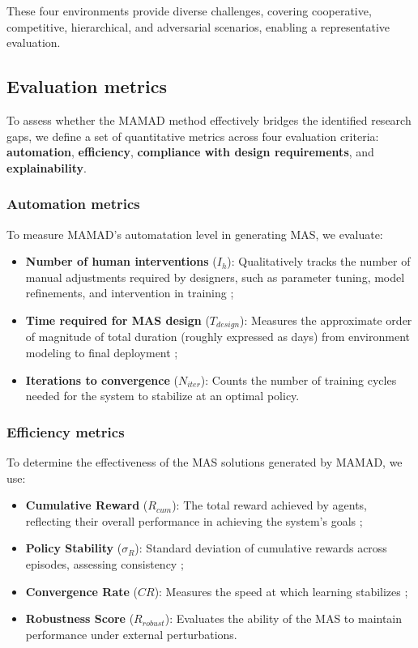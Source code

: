 \documentclass[journal]{IEEEtai}
\begin{document}
\noindent These four environments provide diverse challenges, covering cooperative, competitive, hierarchical, and adversarial scenarios, enabling a representative evaluation.


\subsection{Evaluation metrics}

To assess whether the MAMAD method effectively bridges the identified research gaps, we define a set of quantitative metrics across four evaluation criteria: \textbf{automation}, \textbf{efficiency}, \textbf{compliance with design requirements}, and \textbf{explainability}.

\subsubsection{Automation metrics}
To measure MAMAD's automatation level in generating MAS, we evaluate:
\begin{itemize}
    \item \textbf{Number of human interventions} ($I_h$): Qualitatively tracks the number of manual adjustments required by designers, such as parameter tuning, model refinements, and intervention in training ;
    \item \textbf{Time required for MAS design} ($T_{design}$): Measures the approximate order of magnitude of total duration (roughly expressed as days) from environment modeling to final deployment ;
    \item \textbf{Iterations to convergence} ($N_{iter}$): Counts the number of training cycles needed for the system to stabilize at an optimal policy.
\end{itemize}

\subsubsection{Efficiency metrics}
To determine the effectiveness of the MAS solutions generated by MAMAD, we use:
\begin{itemize}
    \item \textbf{Cumulative Reward} ($R_{cum}$): The total reward achieved by agents, reflecting their overall performance in achieving the system's goals ;
    \item \textbf{Policy Stability} ($\sigma_R$): Standard deviation of cumulative rewards across episodes, assessing consistency ;
    \item \textbf{Convergence Rate} ($CR$): Measures the speed at which learning stabilizes ;
    \item \textbf{Robustness Score} ($R_{robust}$): Evaluates the ability of the MAS to maintain performance under external perturbations.
\end{itemize}
\end{document}
